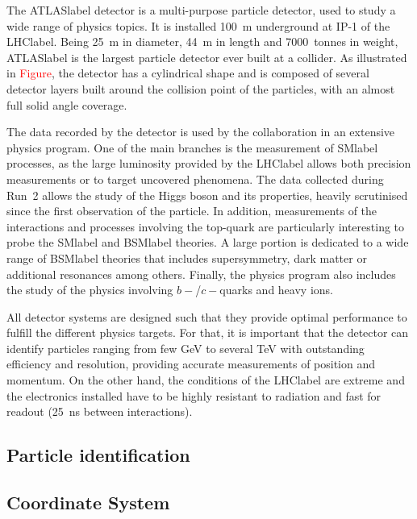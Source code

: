 The \acrshort{ATLASlabel} detector is a multi-purpose particle detector, used to study a wide range of physics topics. It is installed 100~m underground at IP-1 of the \acrshort{LHClabel}. Being 25~m in diameter, 44~m in length and 7000~tonnes in weight, \acrshort{ATLASlabel} is the largest particle detector ever built at a collider. As illustrated in \textcolor{red}{Figure}, the detector has a cylindrical shape and is composed of several detector layers built around the collision point of the particles, with an almost full solid angle coverage.

The data recorded by the detector is used by the collaboration in an extensive physics program. One of the main branches is the measurement of \acrshort{SMlabel} processes, as the large luminosity provided by the \acrshort{LHClabel} allows both precision measurements or to target uncovered phenomena. The data collected during Run~2 allows the study of the Higgs boson and its properties, heavily scrutinised since the first observation of the particle. In addition, measurements of the interactions and processes involving the top-quark are particularly interesting to probe the \acrshort{SMlabel} and \acrshort{BSMlabel} theories. A large portion is dedicated to a wide range of \acrshort{BSMlabel} theories that includes supersymmetry, dark matter or additional resonances among others. Finally, the physics program also includes the study of the physics involving $b-$/$c-$quarks and heavy ions.

All detector systems are designed such that they provide optimal performance to fulfill the different physics targets. For that, it is important that the detector can identify particles ranging from few GeV to several TeV with outstanding efficiency and resolution, providing accurate measurements of position and momentum. On the other hand, the conditions of the \acrshort{LHClabel} are extreme and the electronics installed have to be highly resistant to radiation and fast for readout (25~ns between interactions).

\subsection{Particle identification}


\subsection{Coordinate System}

